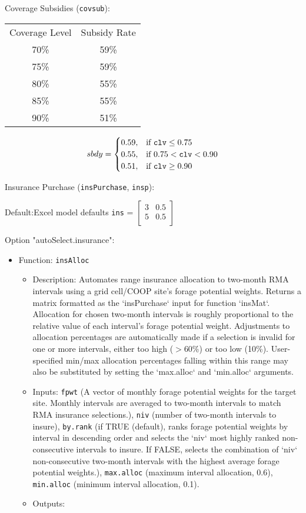 \documentclass[11pt]{article}
\begin{document}
Coverage Subsidies (\verb!covsub!):
\begin{center}
\begin{tabular}{cc}
\hline
Coverage Level & Subsidy Rate \\
70\% & 59\% \\
75\% & 59\% \\
80\% & 55\% \\
85\% & 55\% \\
90\% & 51\% \\
\hline
\end{tabular}
\end{center}

\begin{equation}
sbdy = 
\begin{cases}
0.59, & \text{if}\ \verb!clv! \le 0.75 \\
0.55, & \text{if}\ 0.75 < \verb!clv! < 0.90 \\
0.51, & \text{if}\ \verb!clv! \ge 0.90 
\end{cases}
\end{equation}

Insurance Purchase (\verb!insPurchase!, \verb!insp!):

Default:Excel model defaults
\verb!ins! = 
\( \begin{bmatrix}
3 & 0.5 \\
5 & 0.5 \\
\end{bmatrix}\) 

Option "autoSelect.insurance":
\begin{itemize}
\item Function: \verb!insAlloc!
	\begin{itemize}
	\item Description: Automates range insurance allocation to two-month RMA intervals using a grid cell/COOP site's forage potential weights. Returns a matrix formatted as the `insPurchase` input for function `insMat`. Allocation for chosen two-month intervals is roughly proportional to the relative value of each interval's forage potential weight. Adjustments to allocation percentages are automatically made if a selection is invalid for one or more intervals, either too high ($>$60\%) or too low (10\%). User-specified min/max allocation percentages falling within this range may also be substituted by setting the `max.alloc` and `min.alloc` arguments.
	\item Inputs: \verb!fpwt! (A vector of monthly forage potential weights for the target site. Monthly intervals are averaged to two-month intervals to match RMA insurance selections.), \verb!niv! (number of two-month intervals to insure), \verb!by.rank! (if TRUE (default), ranks forage potential weights by interval in descending order and selects the `niv` most highly ranked non-consecutive intervals to insure. If FALSE, selects the combination of `niv` non-consecutive two-month intervals with the highest average forage potential weights.), \verb!max.alloc!  (maximum interval allocation, 0.6), \verb!min.alloc! (minimum interval allocation, 0.1).
	\item Outputs: 
	\end{itemize}
\end{itemize}
\end{document}
